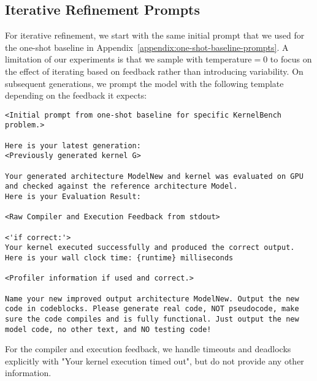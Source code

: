 \subsection{Iterative Refinement Prompts}\label{appendix:multi-turn-baseline-prompts}
For iterative refinement, we start with the same initial prompt that we used for the one-shot baseline in Appendix~\ref{appendix:one-shot-baseline-prompts}. A limitation of our experiments is that we sample with temperature$=0$ to focus on the effect of iterating based on feedback rather than introducing variability. On subsequent generations, we prompt the model with the following template depending on the feedback it expects:
\begin{lstlisting}
<Initial prompt from one-shot baseline for specific KernelBench problem.>

Here is your latest generation:
<Previously generated kernel G>

Your generated architecture ModelNew and kernel was evaluated on GPU and checked against the reference architecture Model.
Here is your Evaluation Result:

<Raw Compiler and Execution Feedback from stdout>

<'if correct:'>
Your kernel executed successfully and produced the correct output.
Here is your wall clock time: {runtime} milliseconds 

<Profiler information if used and correct.>

Name your new improved output architecture ModelNew. Output the new code in codeblocks. Please generate real code, NOT pseudocode, make sure the code compiles and is fully functional. Just output the new model code, no other text, and NO testing code!
\end{lstlisting}

\noindent For the compiler and execution feedback, we handle timeouts and deadlocks explicitly with "Your kernel execution timed out", but do not provide any other information.

